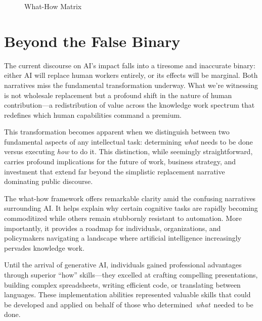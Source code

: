 \documentclass[
  Letterpaper,
]{scrbook}
\begin{document}
\begin{figure}


\caption{\label{fig-what-how-matrix}What-How Matrix}

\end{figure}%

\section{Beyond the False Binary}\label{beyond-the-false-binary}

The current discourse on AI's impact falls into a tiresome and
inaccurate binary: either AI will replace human workers entirely, or its
effects will be marginal. Both narratives miss the fundamental
transformation underway. What we're witnessing is not wholesale
replacement but a profound shift in the nature of human contribution---a
redistribution of value across the knowledge work spectrum that
redefines which human capabilities command a premium.

This transformation becomes apparent when we distinguish between two
fundamental aspects of any intellectual task: determining \emph{what}
needs to be done versus executing \emph{how} to do it. This distinction,
while seemingly straightforward, carries profound implications for the
future of work, business strategy, and investment that extend far beyond
the simplistic replacement narrative dominating public discourse.

The what-how framework offers remarkable clarity amid the confusing
narratives surrounding AI. It helps explain why certain cognitive tasks
are rapidly becoming commoditized while others remain stubbornly
resistant to automation. More importantly, it provides a roadmap for
individuals, organizations, and policymakers navigating a landscape
where artificial intelligence increasingly pervades knowledge work.

Until the arrival of generative AI, individuals gained professional
advantages through superior ``how'' skills---they excelled at crafting
compelling presentations, building complex spreadsheets, writing
efficient code, or translating between languages. These implementation
abilities represented valuable skills that could be developed and
applied on behalf of those who determined~\emph{what}~needed to be done.
\end{document}
